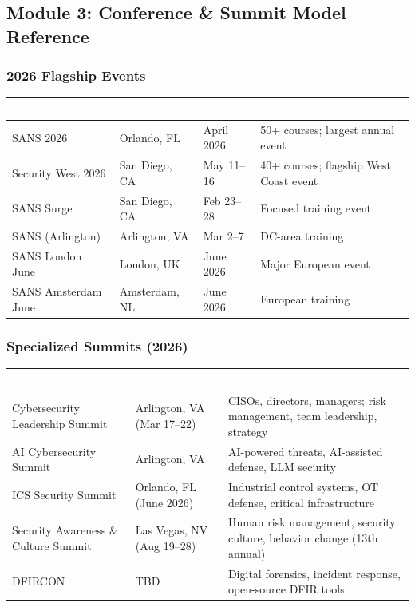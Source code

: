 \documentclass[11pt,letterpaper]{article}
\newcommand{\tableheader}[1]{\textbf{\sffamily\textcolor{white}{#1}}}
\begin{document}
\subsection{Module 3: Conference \& Summit Model Reference}

\subsubsection{2026 Flagship Events}

\begin{center}
\begin{tabularx}{\textwidth}{L{3.5cm}L{2.5cm}L{2cm}X}
\toprule
{}
\tableheader{Event} & \tableheader{Location} & \tableheader{Dates} & \tableheader{Scale} \\
\midrule
SANS 2026 & Orlando, FL & April 2026 & 50+ courses; largest annual event \\
Security West 2026 & San Diego, CA & May 11--16 & 40+ courses; flagship West Coast event \\
SANS Surge & San Diego, CA & Feb 23--28 & Focused training event \\
SANS (Arlington) & Arlington, VA & Mar 2--7 & DC-area training \\
SANS London June & London, UK & June 2026 & Major European event \\
SANS Amsterdam June & Amsterdam, NL & June 2026 & European training \\
\bottomrule
\end{tabularx}
\end{center}

\subsubsection{Specialized Summits (2026)}

\begin{center}
\begin{tabularx}{\textwidth}{L{3.5cm}L{2.5cm}X}
\toprule
{}
\tableheader{Summit} & \tableheader{Location} & \tableheader{Focus} \\
\midrule
Cybersecurity Leadership Summit & Arlington, VA (Mar 17--22) & CISOs, directors, managers; risk management, team leadership, strategy \\
AI Cybersecurity Summit & Arlington, VA & AI-powered threats, AI-assisted defense, LLM security \\
ICS Security Summit & Orlando, FL (June 2026) & Industrial control systems, OT defense, critical infrastructure \\
Security Awareness \& Culture Summit & Las Vegas, NV (Aug 19--28) & Human risk management, security culture, behavior change (13th annual) \\
DFIRCON & TBD & Digital forensics, incident response, open-source DFIR tools \\
\bottomrule
\end{tabularx}
\end{center}
\end{document}
